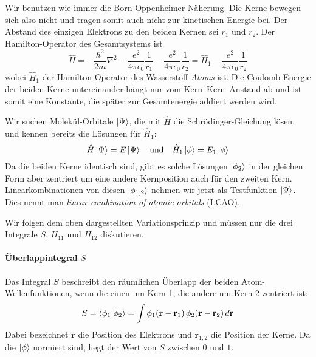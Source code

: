 Wir benutzen wie immer die Born-Oppenheimer-Näherung. Die Kerne bewegen sich also nicht und tragen somit auch nicht zur kinetischen Energie bei. Der Abstand des einzigen Elektrons zu den beiden Kernen sei $r_1$ und $r_2$. Der Hamilton-Operator des Gesamtsystems ist
\begin{equation}
\hat{H} =  - \frac{\hbar^2}{2 m} \nabla^2 - \frac{e^2}{4 \pi \epsilon_0} \frac{1}{r_{1}} - \frac{e^2}{4 \pi \epsilon_0} \frac{1}{r_{2}}
= \hat{H}_1  - \frac{e^2}{4 \pi \epsilon_0} \frac{1}{r_{2}}
\end{equation} 
wobei $\hat{H}_1 $ der Hamilton-Operator des Wasserstoff-\emph{Atoms} ist. Die Coulomb-Energie der beiden Kerne untereinander hängt nur vom Kern--Kern--Anstand ab und ist somit eine Konstante, die später zur Gesamtenergie addiert werden wird.

Wir suchen Molekül-Orbitale $\ket{\Psi}$, die mit $\hat{H}$ die Schrödinger-Gleichung lösen, und kennen bereits die Lösungen für $\hat{H}_1$:
\begin{equation}
\hat{H} \ket{\Psi} = E \ket{\Psi} \quad \text{und} \quad 
\hat{H}_1 \ket{\phi} = E_1 \ket{\phi} 
\end{equation}
Da die beiden Kerne identisch sind, gibt es solche Lösungen $\ket{\phi_2}$ in der gleichen Form aber zentriert um eine andere Kernposition auch für den zweiten Kern. Linearkombinationen von diesen  $\ket{\phi_{1,2}}$ nehmen wir jetzt als Testfunktion $\ket{\Psi}$. Dies nennt man \emph{linear combination of atomic orbitals} (LCAO).

Wir folgen dem oben dargestellten Variationsprinzip und müssen nur die drei Integrale $S$, $ H_{11}$ und $H_{12}$ diskutieren.

\paragraph{Überlappintegral $S$} Das Integral $S$ beschreibt den räumlichen Überlapp der beiden Atom-Wellenfunktionen, wenn die einen um Kern 1, die andere um Kern 2 zentriert ist:
\begin{equation}
 S = \braket{\phi_1 | \phi_2} = \int \phi_1( \mathbf{r} - \mathbf{r}_1)  \, \phi_2( \mathbf{r} - \mathbf{r}_2)   \, d\mathbf{r}
\end{equation}
Dabei bezeichnet $\mathbf{r}$ die Position des Elektrons und  $\mathbf{r}_{1,2}$  die Position der Kerne. Da die $\ket{\phi}$ normiert sind, liegt der Wert von $S$ zwischen $0$ und $1$.


